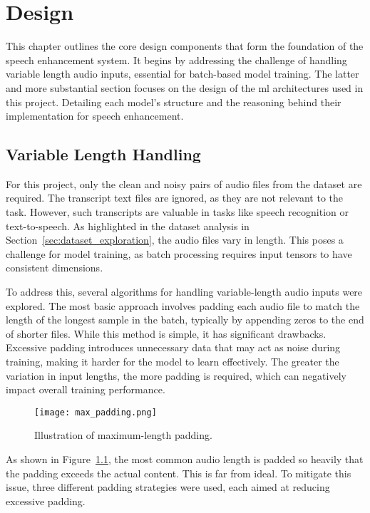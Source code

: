 \graphicspath{{content/chapters/5_design/figures/}}
\chapter{Design}
\label{chp:design}

This chapter outlines the core design components that form the foundation of the speech enhancement system. It begins by addressing the challenge of handling variable length audio inputs, essential for batch-based model training. The latter and more substantial section focuses on the design of the \gls{ml} architectures used in this project. Detailing each model's structure and the reasoning behind their implementation for speech enhancement.

\section{Variable Length Handling}
\label{sec:variable_length_handling}

For this project, only the clean and noisy pairs of audio files from the dataset are required. The transcript text files are ignored, as they are not relevant to the task. However, such transcripts are valuable in tasks like speech recognition or text-to-speech. As highlighted in the dataset analysis in Section~\ref{sec:dataset_exploration}, the audio files vary in length. This poses a challenge for model training, as batch processing requires input tensors to have consistent dimensions.

To address this, several algorithms for handling variable-length audio inputs were explored. The most basic approach involves padding each audio file to match the length of the longest sample in the batch, typically by appending zeros to the end of shorter files. While this method is simple, it has significant drawbacks. Excessive padding introduces unnecessary data that may act as noise during training, making it harder for the model to learn effectively. The greater the variation in input lengths, the more padding is required, which can negatively impact overall training performance.

\begin{figure}[h]
    \centering
    \texttt{[image: max\_padding.png]}
    \caption{\label{fig:max_padding}Illustration of maximum-length padding.}
\end{figure}

As shown in Figure~\ref{fig:max_padding}, the most common audio length is padded so heavily that the padding exceeds the actual content. This is far from ideal. To mitigate this issue, three different padding strategies were used, each aimed at reducing excessive padding.

